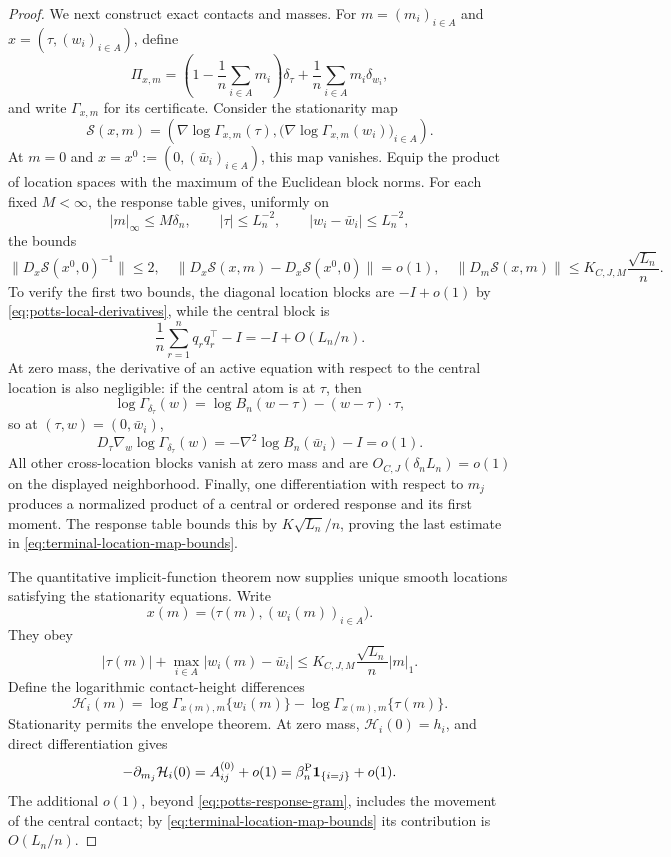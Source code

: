 \begin{proof}
We next construct exact contacts and masses.  For
\(m=(m_i)_{i\in A}\) and
\(x=(\tau,(w_i)_{i\in A})\), define
\[
 \Pi_{x,m}
 =\left(1-\frac1n\sum_{i\in A}m_i\right)\delta_\tau
  +\frac1n\sum_{i\in A}m_i\delta_{w_i},
\]
and write \(\Gamma_{x,m}\) for its certificate.  Consider the stationarity
map
\[
 \mathcal S(x,m)
 =\left(
   \nabla\log\Gamma_{x,m}(\tau),
   \bigl(\nabla\log\Gamma_{x,m}(w_i)\bigr)_{i\in A}
  \right).
\]
At \(m=0\) and
\(x=x^0:=(0,(\bar w_i)_{i\in A})\), this map vanishes.  Equip the product
of location spaces with the maximum of the Euclidean block norms.  For
each fixed \(M<\infty\), the response table gives, uniformly on
\[
 |m|_\infty\le M\delta_n,
 \qquad |\tau|\le L_n^{-2},
 \qquad |w_i-\bar w_i|\le L_n^{-2},
\]
the bounds
\begin{equation}
\label{eq:terminal-location-map-bounds}
 \|D_x\mathcal S(x^0,0)^{-1}\|\le2,
 \quad
 \|D_x\mathcal S(x,m)-D_x\mathcal S(x^0,0)\|=o(1),
 \quad
 \|D_m\mathcal S(x,m)\|
 \le K_{C,J,M}\frac{\sqrt{L_n}}n.
\end{equation}
To verify the first two bounds, the diagonal location blocks are
\(-I+o(1)\) by \eqref{eq:potts-local-derivatives}, while the central block
is
\[
 \frac1n\sum_{r=1}^nq_rq_r^\top-I=-I+O(L_n/n).
\]
At zero mass, the derivative of an active equation with respect to the
central location is also negligible: if the central atom is at \(\tau\),
then
\[
 \log\Gamma_{\delta_\tau}(w)
 =\log B_n(w-\tau)-(w-\tau)\cdot\tau,
\]
so at \((\tau,w)=(0,\bar w_i)\),
\[
 D_\tau\nabla_w\log\Gamma_{\delta_\tau}(w)
 =-\nabla^2\log B_n(\bar w_i)-I=o(1).
\]
All other cross-location blocks vanish at zero mass and are
\(O_{C,J}(\delta_nL_n)=o(1)\) on the displayed neighborhood.  Finally,
one differentiation with respect to \(m_j\) produces a normalized product
of a central or ordered response and its first moment.  The response table
bounds this by \(K\sqrt{L_n}/n\), proving the last estimate in
\eqref{eq:terminal-location-map-bounds}.

The quantitative implicit-function theorem now supplies unique smooth
locations satisfying the stationarity equations.  Write
\[
 x(m)=\bigl(\tau(m),(w_i(m))_{i\in A}\bigr).
\]
They obey
\begin{equation}
\label{eq:terminal-location-map-rate}
 |\tau(m)|+\max_{i\in A}|w_i(m)-\bar w_i|
 \le K_{C,J,M}\frac{\sqrt{L_n}}n|m|_1.
\end{equation}
Define the logarithmic contact-height differences
\[
 \mathcal H_i(m)
 =\log\Gamma_{x(m),m}\{w_i(m)\}
  -\log\Gamma_{x(m),m}\{\tau(m)\}.
\]
Stationarity permits the envelope theorem.  At zero mass,
\(\mathcal H_i(0)=h_i\), and direct differentiation gives
\begin{equation}
\label{eq:terminal-mass-contact-jacobian}
 -\partial_{m_j}\mathcal H_i(0)
 =A_{ij}^{(0)}+o(1)
 =\beta_n^{\rm P}\mathbf1_{\{i=j\}}+o(1).
\end{equation}
The additional \(o(1)\), beyond
\eqref{eq:potts-response-gram}, includes the movement of the central
contact; by \eqref{eq:terminal-location-map-bounds} its contribution is
\(O(L_n/n)\).


\end{proof}

